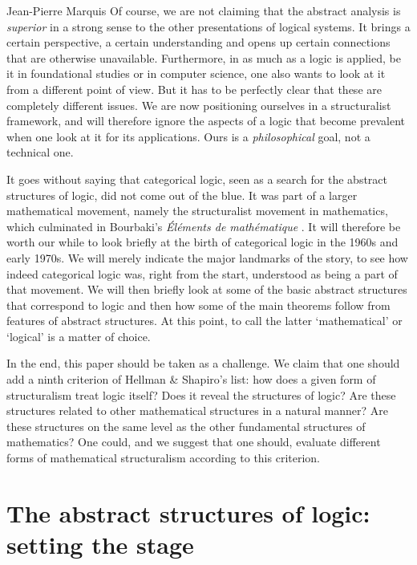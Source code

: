 \begin{artengenv}{Jean-Pierre Marquis}
Of course, we are not claiming that the abstract analysis is \emph{superior} in a strong sense to the other presentations of logical systems. It brings a certain perspective, a certain understanding and opens up certain connections that are otherwise unavailable. Furthermore, in as much as a logic is applied, be it in foundational studies or in computer science, one also wants to look at it from a different point of view. But it has to be perfectly clear that these are completely different issues. We are now positioning ourselves in a structuralist framework, and will therefore ignore the aspects of a logic that become prevalent when one look at it for its applications. Ours is a \emph{philosophical} goal, not a technical one.


It goes without saying that categorical logic, seen as a search for the abstract structures of logic, did not come out of the blue. It was part of a larger mathematical movement, namely the structuralist movement in mathematics, which culminated in Bourbaki's \emph{Éléments de mathématique} \parencite[for more on the prehistory and the history of mathematical structuralism, see][]{Corry2004, Reck:2020}. It will therefore be worth our while to look briefly at the birth of categorical logic in the 1960s and early 1970s. We will merely indicate the major landmarks of the story, to see how indeed categorical logic was, right from the start, understood as being a part of that movement. We will then briefly look at some of the basic abstract structures that correspond to logic and then how some of the main theorems follow from features of abstract structures. At this point, to call the latter `mathematical' or `logical' is a matter of choice.

In the end, this paper should be taken as a challenge. We claim that one should add a ninth criterion of Hellman \& Shapiro's list: how does a given form of structuralism treat logic itself? Does it reveal the structures of logic? Are these structures related to other mathematical structures in a natural manner? Are these structures on the same level as the other fundamental structures of mathematics? One could, and we suggest that one should, evaluate different forms of mathematical structuralism according to this criterion. 

\section{The abstract structures of logic:\\setting the stage}


\end{artengenv}
